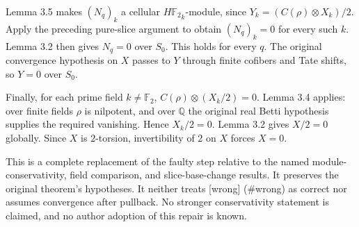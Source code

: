 \documentclass[10pt]{article}
\begin{document}
Lemma 3.5 makes \((N_q)_k\) a cellular \({H\mathbb F_2}_k\)-module, since \(Y_k=(C(\rho)\otimes X_k)/2\). Apply the preceding pure-slice argument to obtain \((N_q)_k=0\) for every such \(k\). Lemma 3.2 then gives \(N_q=0\) over \(S_0\). This holds for every \(q\). The original convergence hypothesis on \(X\) passes to \(Y\) through finite cofibers and Tate shifts, so \(Y=0\) over \(S_0\).\par
Finally, for each prime field \(k\ne\mathbb F_2\), \(C(\rho)\otimes(X_k/2)=0\). Lemma 3.4 applies: over finite fields \(\rho\) is nilpotent, and over \(\mathbb Q\) the original real Betti hypothesis supplies the required vanishing. Hence \(X_k/2=0\). Lemma 3.2 gives \(X/2=0\) globally. Since \(X\) is \(2\)-torsion, invertibility of \(2\) on \(X\) forces \(X=0\).\par
This is a complete replacement of the faulty step relative to the named module-conservativity, field comparison, and slice-base-change results. It preserves the original theorem’s hypotheses. It neither treats [wrong] (\#wrong) as correct nor assumes convergence after pullback. No stronger conservativity statement is claimed, and no author adoption of this repair is known.\par
\end{document}

